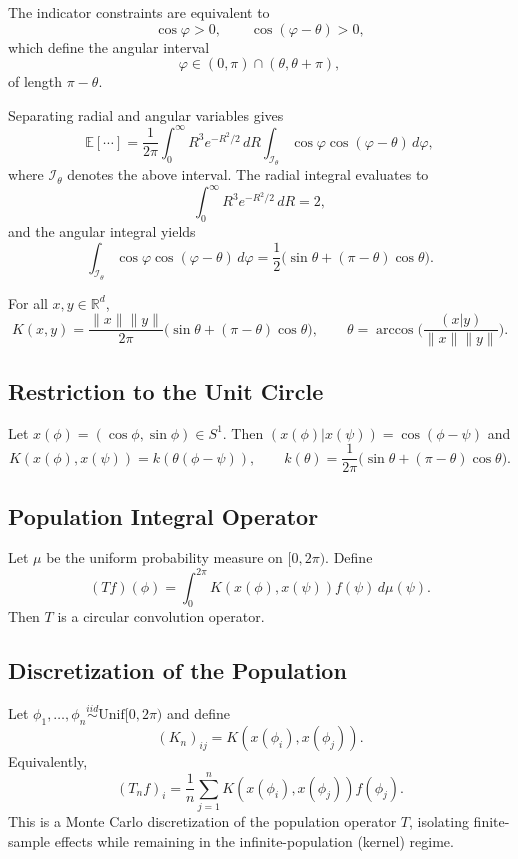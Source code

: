 The indicator constraints are equivalent to
\[
	\cos\varphi>0,
	\qquad
	\cos(\varphi-\theta)>0,
\]
which define the angular interval
\[
	\varphi\in(0,\pi)\cap(\theta,\theta+\pi),
\]
of length $\pi-\theta$.

Separating radial and angular variables gives
\[
	\mathbb E[\cdots]
	=
	\frac{1}{2\pi}
	\int_0^\infty R^3 e^{-R^2/2}\,dR
	\int_{\mathcal I_\theta}
	\cos\varphi\cos(\varphi-\theta)\,d\varphi,
\]
where $\mathcal I_\theta$ denotes the above interval.
The radial integral evaluates to
\[
	\int_0^\infty R^3 e^{-R^2/2}\,dR = 2,
\]
and the angular integral yields
\[
	\int_{\mathcal I_\theta}\cos\varphi\cos(\varphi-\theta)\,d\varphi
	=
	\frac{1}{2}\big(\sin\theta+(\pi-\theta)\cos\theta\big).
\]

\begin{theorem}
	\label{thm:arc-cosine}
	For all $x,y\in\mathbb R^d$,
	\[
		K(x,y)
		=
		\frac{\|x\|\|y\|}{2\pi}
		\big(\sin\theta+(\pi-\theta)\cos\theta\big),
		\qquad
		\theta=\arccos\!\Big(\frac{(x|y)}{\|x\|\|y\|}\Big).
	\]
\end{theorem}

\subsection{Restriction to the Unit Circle}

Let $x(\phi)=(\cos\phi,\sin\phi)\in S^1$.
Then $(x(\phi)|x(\psi))=\cos(\phi-\psi)$ and
\[
	K(x(\phi),x(\psi))=k(\theta(\phi-\psi)),
	\qquad
	k(\theta)=\frac{1}{2\pi}\big(\sin\theta+(\pi-\theta)\cos\theta\big).
\]

\subsection{Population Integral Operator}

Let $\mu$ be the uniform probability measure on $[0,2\pi)$.
Define
\[
	(Tf)(\phi)
	=
	\int_0^{2\pi}K(x(\phi),x(\psi))f(\psi)\,d\mu(\psi).
\]
Then $T$ is a circular convolution operator.

\subsection{Discretization of the Population}

Let $\phi_1,\dots,\phi_n\stackrel{iid}{\sim}\mathrm{Unif}[0,2\pi)$ and define
\[
	(K_n)_{ij}=K(x(\phi_i),x(\phi_j)).
\]
Equivalently,
\[
	(T_nf)_i=\frac1n\sum_{j=1}^nK(x(\phi_i),x(\phi_j))f(\phi_j).
\]
This is a Monte Carlo discretization of the population operator $T$,
isolating finite-sample effects while remaining in the infinite-population
(kernel) regime.
